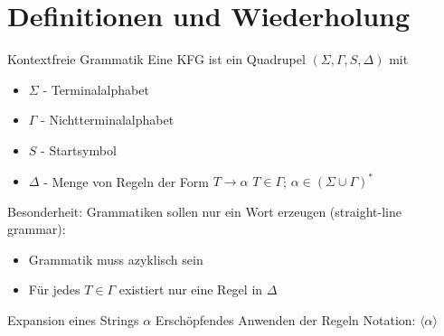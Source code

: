 \section{Definitionen und Wiederholung}
\begin{frame}{\FrameName}
	\begin{block}{Kontextfreie Grammatik}
		\Gap
		Eine KFG ist ein Quadrupel $(\Sigma,\Gamma,S,\Delta)$ mit
		\begin{itemize}
			\item $\Sigma$ - Terminalalphabet
			\item $\Gamma$ - Nichtterminalalphabet
			\item $S$ - Startsymbol
			\item $\Delta$ - Menge von Regeln der Form $T\rightarrow\alpha$\linebreak
			$T \in \Gamma$;
			$\alpha \in (\Sigma \cup \Gamma)^\ast$
		\end{itemize}
	\end{block}
	
\end{frame}

\begin{frame}{\FrameName}
\begin{alert}{Besonderheit:}
	\Gap
	Grammatiken sollen nur ein Wort erzeugen (straight-line grammar):
	\begin{itemize}
		
		\item Grammatik muss azyklisch sein
		\item Für jedes $T \in \Gamma$ existiert nur eine Regel in $\Delta$
	\end{itemize}
\end{alert}
\end{frame}

\begin{frame}{\FrameName}
\begin{block}{Expansion  eines Strings $\alpha$}
	\Gap
	Erschöpfendes Anwenden der Regeln \linebreak
	Notation: $\langle \alpha \rangle$

\end{block}
\end{frame}

